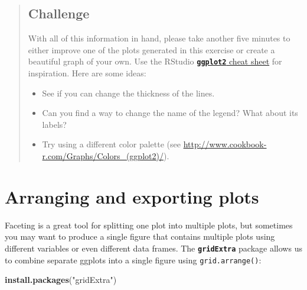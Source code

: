 \documentclass[]{book}
\newenvironment{Shaded}{\begin{snugshade}}{\end{snugshade}}
\newcommand{\KeywordTok}[1]{\textcolor[rgb]{0.13,0.29,0.53}{\textbf{#1}}}
\newcommand{\StringTok}[1]{\textcolor[rgb]{0.31,0.60,0.02}{#1}}
\newcommand{\NormalTok}[1]{#1}
\providecommand{\tightlist}{%
  \setlength{\itemsep}{0pt}\setlength{\parskip}{0pt}}
\begin{document}
\begin{quote}
\subsection{Challenge}\label{challenge-10}

With all of this information in hand, please take another five minutes
to either improve one of the plots generated in this exercise or create
a beautiful graph of your own. Use the RStudio
\href{https://www.rstudio.com/wp-content/uploads/2016/11/ggplot2-cheatsheet-2.1.pdf}{\textbf{\texttt{ggplot2}}
cheat sheet} for inspiration. Here are some ideas:

\begin{itemize}
\tightlist
\item
  See if you can change the thickness of the lines.
\item
  Can you find a way to change the name of the legend? What about its
  labels?
\item
  Try using a different color palette (see
  \url{http://www.cookbook-r.com/Graphs/Colors_(ggplot2)/}).
\end{itemize}
\end{quote}

\section{Arranging and exporting
plots}\label{arranging-and-exporting-plots}

Faceting is a great tool for splitting one plot into multiple plots, but
sometimes you may want to produce a single figure that contains multiple
plots using different variables or even different data frames. The
\textbf{\texttt{gridExtra}} package allows us to combine separate
ggplots into a single figure using \texttt{grid.arrange()}:

\begin{Shaded}
\begin{Highlighting}[]
\KeywordTok{install.packages}\NormalTok{(}\StringTok{"gridExtra"}\NormalTok{)}
\end{Highlighting}
\end{Shaded}
\end{document}
